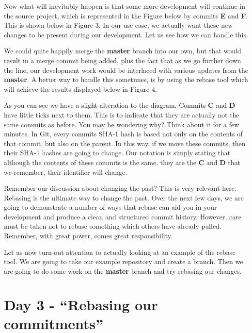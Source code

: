 
Now what will inevitably happen is that some more development will continue in the source project, which is represented in the Figure below by commits \textbf{E} and \textbf{F}.
This is shown below in Figure 3.
In our use case, we actually want these new changes to be present during our development.
Let us see how we can handle this.


We could quite happily merge the \textbf{master} branch into our own, but that would result in a merge commit being added, plus the fact that as we go further down the line, our development work would be interlaced with various updates from the \textbf{master}.
A better way to handle this sometimes, is by using the rebase tool which will achieve the results displayed below in Figure 4.


As you can see we have a slight alteration to the diagram.
Commits \textbf{C} and \textbf{D} have little ticks next to them.
This is to indicate that they are actually not the same commits as before.
You may be wondering why? Think about it for a few minutes.
In Git, every commits SHA-1 hash is based not only on the contents of that commit, but also on the parent.
In this way, if we move these commits, then their SHA-1 hashes are going to change.
Our notation is simply stating that although the contents of these commits is the same, they are the \textbf{C} and \textbf{D} that we remember, their identifier will change.

Remember our discussion about changing the past? This is very relevant here.
Rebasing is the ultimate way to change the past.
Over the next few days, we are going to demonstrate a number of ways that rebase can aid you in your development and produce a clean and structured commit history.
However, care must be taken not to rebase something which others have already pulled.
Remember, with great power, comes great responsibility.

Let us now turn out attention to actually looking at an example of the rebase tool.
We are going to take our example repository and create a branch.
Then we are going to do some work on the \textbf{master} branch and try rebasing our changes.

\section{Day 3 - ``Rebasing our commitments''}
